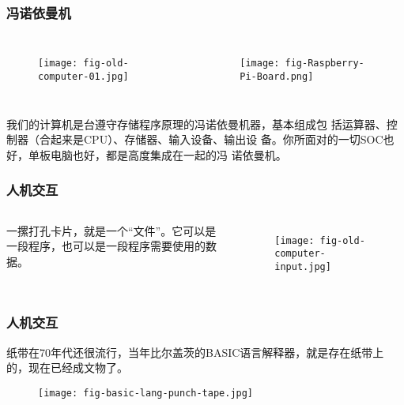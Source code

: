 \begin{frame}
  \frametitle{冯诺依曼机}

  \begin{columns}

    \begin{figure}
      \centering
      \texttt{[image: fig-old-computer-01.jpg]}
    \end{figure}

    

        \begin{figure}
      \centering
      \texttt{[image: fig-Raspberry-Pi-Board.png]}
    \end{figure}
  \end{columns}

  \pause
  
  {\kai 我们的计算机是台遵守存储程序原理的冯诺依曼机器，基本组成包
    括{\Red\hei 运算器、控制器（合起来是CPU）、存储器、输入设备、输出设
      备}。你所面对的一切SOC也好，单板电脑也好，都是高度集成在一起的冯
    诺依曼机。}
\end{frame}

\begin{frame}
  \frametitle{人机交互}

  
  \begin{columns}

    一摞打孔卡片，就是一个“文件”。它可以是一段程序，也可以是一段程序需要使用的数据。
    
    \begin{figure}
      \centering
      \texttt{[image: fig-old-computer-input.jpg]}
    \end{figure}
  \end{columns}

\end{frame}


\begin{frame}
  \frametitle{人机交互}


  纸带在70年代还很流行，当年比尔盖茨的BASIC语言解释器，就是存在纸带上的，现在已经成文物了。
  
  \begin{figure}
    \centering
    \texttt{[image: fig-basic-lang-punch-tape.jpg]}
  \end{figure}

\end{frame}

